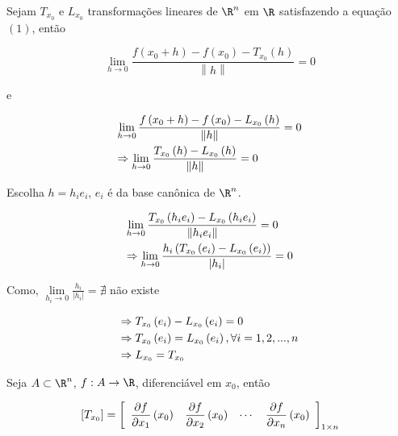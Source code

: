 \documentclass[11pt, oneside, a4paper]{gsm-l}
\begin{document}
\begin{dem}
    Sejam ${T_{x_0 } }$ e ${L_{x_0 } }$ transformações lineares de $\R^n$ em $\R$ satisfazendo a equação $(1)$, então

\[
    \mathop {\lim }\limits_{h \to 0} \frac{{f\left( {x_0  + h} \right) - f\left( {x_0 } \right) - T_{x_0 } \left( h \right)}}{{\left\| h \right\|}} = 0
\]

e

\[
\begin{gathered}
      \mathop {\lim }\limits_{h \to 0} \frac{{f\left( {x_0  + h} \right) - f\left( {x_0 } \right) - L_{x_0 } \left( h \right)}}{{\left\| h \right\|}} = 0 \hfill \\
       \Rightarrow \mathop {\lim }\limits_{h \to 0} \frac{{T_{x_0 } \left( h \right) - L_{x_0 } \left( h \right)}}{{\left\| h \right\|}} = 0 \hfill \\
\end{gathered}
\]

Escolha $h = h_i e_i$, $e_i$ é da base can\^onica de $\R^n$.

\[
\begin{gathered}
      \mathop {\lim }\limits_{h \to 0} \frac{{T_{x_0 } \left( {h_i e_i } \right) - L_{x_0 } \left( {h_i e_i } \right)}}{{\left\| {h_i e_i } \right\|}} = 0 \hfill \\
       \Rightarrow \mathop {\lim }\limits_{h \to 0} \frac{{h_i \left( {T_{x_0 } \left( {e_i } \right) - L_{x_0 } \left( {e_i } \right)} \right)}}{{\left| {h_i } \right|}} = 0 \hfill \\
\end{gathered}
\]

    Como, $\mathop {\lim }\limits_{h_i  \to 0} \frac{{h_i }}{{\left| {h_i } \right|}} = \nexists$ não existe

\[
\begin{gathered}
   \Rightarrow T_{x_0 } \left( {e_i } \right) - L_{x_0 } \left( {e_i } \right) = 0 \hfill \\
   \Rightarrow T_{x_0 } \left( {e_i } \right) = L_{x_0 } \left( {e_i } \right),\forall i = 1,2,...,n \hfill \\
\Rightarrow L_{x_0 }  = T_{x_0 }  \hfill \\
\end{gathered}
\]

\end{dem}

\begin{teo}
    Seja $A \subset \R^n$, $f:A \to \R$, diferenciável em $x_0$, então

\[
\left[ {T_{x_0 } } \right] = \left[ {\begin{array}{*{20}c}\displaystyle
    {\frac{{\partial f}}{{\partial x_1 }}\left( {x_0 } \right)} & \displaystyle {\frac{{\partial f}}{{\partial x_2 }}\left( {x_0 } \right)} &  \cdots  & \displaystyle {\frac{{\partial f}}{{\partial x_n }}\left( {x_0 } \right)}  \\
\end{array} } \right]_{1 \times n}
\]

\end{teo}
\end{document}
